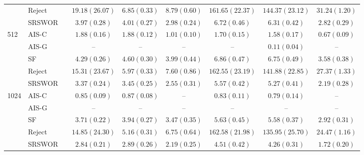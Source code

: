 \begin{tabular}{lllccc|ccc}
                     & Reject &  & $19.18(26.07)$ & $6.85(0.33)$   & $8.79(0.60)$   & $161.65(22.37)$& $144.37(23.12)$& $31.24(1.20)$  \\
                     & SRSWOR &  & $3.97(0.28)$   & $4.01(0.27)$   & $2.98(0.24)$   & $6.72(0.46)$   & $6.31(0.42)$   & $2.82(0.29)$   \\
\midrule
\multirow{5}{*}{512} & AIS-C  &  & $1.88(0.16)$   & $1.88(0.12)$   & $1.01(0.10)$   & $1.70(0.15)$   & $1.58(0.17)$   & $0.67(0.09)$   \\
                     & AIS-G  &  & --             & --             & --             & --             & $0.11(0.04)$   & --             \\
                     & SF     &  & $4.29(0.26)$   & $4.60(0.30)$   & $3.99(0.44)$   & $6.86(0.47)$   & $6.75(0.49)$   & $3.58(0.38)$   \\
                     & Reject &  & $15.31(23.67)$ & $5.97(0.33)$   & $7.60(0.86)$   & $162.55(23.19)$& $141.88(22.85)$& $27.37(1.33)$  \\
                     & SRSWOR &  & $3.37(0.24)$   & $3.45(0.25)$   & $2.55(0.31)$   & $5.57(0.42)$   & $5.27(0.41)$   & $2.19(0.28)$   \\
\midrule
\multirow{5}{*}{1024}& AIS-C  &  & $0.85(0.09)$   & $0.87(0.08)$   & --             & $0.83(0.11)$   & $0.79(0.14)$   & --             \\
                     & AIS-G  &  & --             & --             & --             & --             & --             & --             \\
                     & SF     &  & $3.71(0.22)$   & $3.94(0.27)$   & $3.47(0.35)$   & $5.63(0.45)$   & $5.58(0.37)$   & $2.92(0.31)$   \\
                     & Reject &  & $14.85(24.30)$ & $5.16(0.31)$   & $6.75(0.64)$   & $162.58(21.98)$& $135.95(25.70)$& $24.47(1.16)$  \\
                     & SRSWOR &  & $2.84(0.21)$   & $2.89(0.26)$   & $2.19(0.25)$   & $4.51(0.42)$   & $4.26(0.31)$   & $1.72(0.20)$   \\
\bottomrule
\end{tabular}
